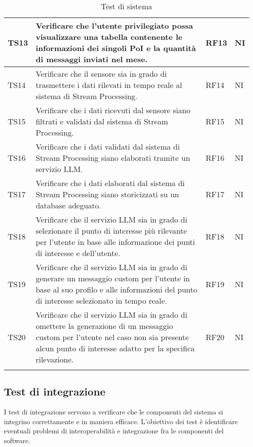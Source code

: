 \documentclass[10pt]{article}
\begin{document}
\begin{justify}
\begin{longtable}{|>{\centering\arraybackslash}m{2cm}|>{\centering\arraybackslash}m{7cm}|>{\centering\arraybackslash}m{2cm}|>{\centering\arraybackslash}m{2cm}|}
\hline
TS13 & Verificare che l'utente privilegiato possa visualizzare una tabella contenente le informazioni dei singoli PoI e la quantità di messaggi inviati nel mese. & RF13 & NI\\
\hline
TS14 & Verificare che il sensore sia in grado di trasmettere i dati rilevati in tempo reale al sistema di Stream Processing. & RF14 & NI\\
\hline
TS15 & Verificare che i dati ricevuti dal sensore siano filtrati e validati dal sistema di Stream Processing. & RF15 & NI\\
\hline
TS16 & Verificare che i dati validati dal sistema di Stream Processing siano elaborati tramite un servizio LLM. & RF16 & NI\\
\hline
TS17 & Verificare che i dati elaborati dal sistema di Stream Processing siano storicizzati su un database adeguato. & RF17 & NI\\
\hline
TS18 & Verificare che il servizio LLM sia in grado di selezionare il punto di interesse più rilevante per l'utente in base alle informazione dei punti di interesse e dell'utente. & RF18 & NI\\
\hline
TS19 & Verificare che il servizio LLM sia in grado di generare un messaggio custom per l'utente in base al suo profilo e alle informazioni del punto di interesse selezionato in tempo reale. & RF19 & NI\\
\hline
TS20 & Verificare che il servizio LLM sia in grado di omettere la generazione di un messaggio custom per l'utente nel caso non sia presente alcun punto di interesse adatto per la specifica rilevazione. & RF20 & NI\\
\hline
\caption{Test di sistema}\\
\end{longtable}

\subsection{Test di integrazione}
I test di integrazione servono a verificare che le componenti del sistema si integrino correttamente e in maniera efficace. L'obiettivo dei test
è identificare eventuali problemi di interoperabilità e integrazione fra le componenti del software.\\


\end{justify}
\end{document}
